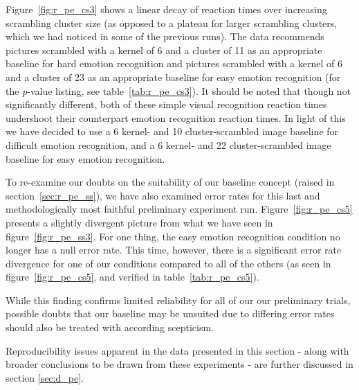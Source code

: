 	    Figure~\ref{fig:r_pe_cs3} shows a linear decay of reaction times over increasing scrambling cluster size
	    (as opposed to a plateau for larger scrambling clusters, which we had noticed in some of the previous runs).
	    The data recommends pictures scrambled with a kernel of \SI{6}{\pixel} and a cluster of \SI{11}{\pixel} as an appropriate baseline for hard emotion recognition
	    and pictures scrambled with a kernel of \SI{6}{\pixel} and a cluster of \SI{23}{\pixel} as an appropriate baseline for easy emotion recognition
	    (for the \textit{p}-value listing, see table~\ref{tab:r_pe_cs3}).
	    It should be noted that though not significantly different, both of these simple visual recognition reaction times undershoot their counterpart emotion recognition reaction times.
	    In light of this we have decided to use a \SI{6}{\pixel} kernel- and \SI{10}{\pixel} cluster-scrambled image baseline for difficult emotion recognition, 
	    and a \SI{6}{\pixel} kernel- and \SI{22}{\pixel} cluster-scrambled image baseline for easy emotion recognition.
	    
	    
	    To re-examine our doubts on the suitability of our baseline concept (raised in section~\ref{sec:r_pe_ss}), we have also examined error rates for this last and methodologically most faithful preliminary experiment run.
	    Figure~\ref{fig:r_pe_cs5} presents a slightly divergent picture from what we have seen in figure~\ref{fig:r_pe_ss3}.
	    For one thing, the easy emotion recognition condition no longer has a null error rate.
	    This time, however, there is a significant error rate divergence for one of our conditions compared to all of the others (as seen in figure~\ref{fig:r_pe_cs5}, and verified in table~\ref{tab:r_pe_cs5}).
	
	    While this finding confirms limited reliability for all of our our preliminary trials, possible doubts that our baseline may be unsuited due to differing error rates should also be treated with according scepticism.
	    
	    Reproducibility issues apparent in the data presented in this section - along with broader conclusions to be drawn from these experiments - are further discussed in section \ref{sec:d_pe}.
	    
